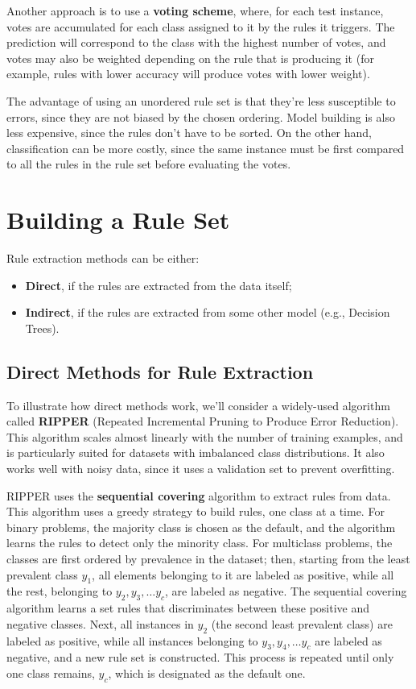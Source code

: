 Another approach is to use a \textbf{voting scheme}, where, for each test instance, votes are accumulated for each class assigned to it by the rules it triggers. The prediction will correspond to the class with the highest number of votes, and votes may also be weighted depending on the rule that is producing it (for example, rules with lower accuracy will produce votes with lower weight).

The advantage of using an unordered rule set is that they're less susceptible to errors, since they are not biased by the chosen ordering. Model building is also less expensive, since the rules don't have to be sorted. On the other hand, classification can be more costly, since the same instance must be first compared to all the rules in the rule set before evaluating the votes.

\section{Building a Rule Set}

Rule extraction methods can be either:
\begin{itemize}
    \item \textbf{Direct}, if the rules are extracted from the data itself;
    \item \textbf{Indirect}, if the rules are extracted from some other model (e.g., Decision Trees).
\end{itemize}

\subsection{Direct Methods for Rule Extraction}

To illustrate how direct methods work, we'll consider a widely-used algorithm called \textbf{RIPPER} (Repeated Incremental Pruning to Produce Error Reduction). This algorithm scales almost linearly with the number of training examples, and is particularly suited for datasets with imbalanced class distributions. It also works well with noisy data, since it uses a validation set to prevent overfitting.

RIPPER uses the \textbf{sequential covering} algorithm to extract rules from data. This algorithm uses a greedy strategy to build rules, one class at a time. For binary problems, the majority class is chosen as the default, and the algorithm learns the rules to detect only the minority class. For multiclass problems, the classes are first ordered by prevalence in the dataset; then, starting from the least prevalent class $y_1$, all elements belonging to it are labeled as positive, while all the rest, belonging to $y_2, y_3, \dots y_c$, are labeled as negative. The sequential covering algorithm learns a set rules that discriminates between these positive and negative classes. Next, all instances in $y_2$ (the second least prevalent class) are labeled as positive, while all instances belonging to $y_3, y_4, \dots y_c$ are labeled as negative, and a new rule set is constructed. This process is repeated until only one class remains, $y_c$, which is designated as the default one.

